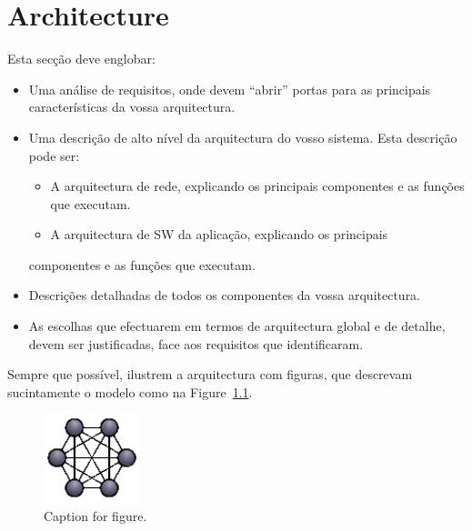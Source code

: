 \chapter{Architecture}
\label{chapter:architecture}
Esta secção deve englobar:

\begin{itemize}
    \item Uma análise de requisitos, onde devem “abrir” portas para as principais
        características da vossa arquitectura.
    \item Uma descrição de alto nível da arquitectura do vosso sistema. Esta descrição
        pode ser:
        \begin{itemize}
            \item A arquitectura de rede, explicando os principais componentes e as
                funções que executam.
            \item A arquitectura de SW da aplicação, explicando os principais
        \end{itemize}
        componentes e as funções que executam.
    \item Descrições detalhadas de todos os componentes da vossa arquitectura.
    \item As escolhas que efectuarem em termos de arquitectura global e de detalhe,
        devem ser justificadas, face aos requisitos que identificaram.
\end{itemize}

Sempre que possível, ilustrem a arquitectura com figuras, que descrevam
sucintamente o modelo como na Figure~\ref{fig:logoCNM}.

\begin{figure}[!htb]
  \centering
  \includegraphics[width=0.25\textwidth]{Figures/logoCNM.png}
  \caption[Caption for figure in TOC]{Caption for figure.}
  \label{fig:logoCNM}
\end{figure}

